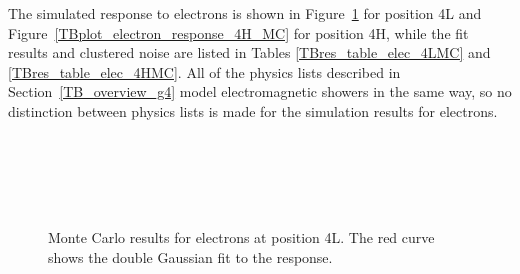 The simulated response to electrons is shown in Figure~\ref{TB_electron_MC_response_4L} for position 4L and Figure~\ref{TBplot_electron_response_4H_MC} for position 4H, while the fit results and clustered noise are listed in Tables \ref{TBres_table_elec_4LMC} and \ref{TBres_table_elec_4HMC}. All of the physics lists described in Section~\ref{TB_overview_g4} model electromagnetic showers in the same way, so no distinction between physics lists is made for the simulation results for electrons. 




\begin{figure}[tbp]
\begin{center}
\\
\\
\\
\\
\end{center}
\caption[Monte Carlo results for electrons at position 4L]{Monte Carlo results for electrons at position 4L. The red curve shows the double Gaussian fit to the response.}
\label{TB_electron_MC_response_4L}
\end{figure}

